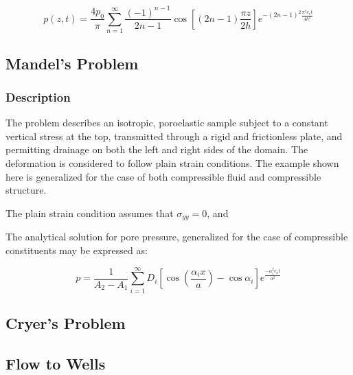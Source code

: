 \begin{equation}
 p(z,t) = \frac{4 p_{0}} {\pi} \sum_{n = 1}^{\infty} \frac{(-1)^{n-1}}{2n-1} \cos \left[ \left(2 n -1 \right) \frac{\pi z}{2 h} \right] e^{-\left(2 n - 1 \right)^{2} \frac{ \pi^{2} c_{v} t}{4 h^{2}}}
\end{equation}

\subsection{Mandel's Problem}

\subsubsection{Description}
The problem describes an isotropic, poroelastic sample subject to a constant vertical stress at the top, transmitted through a rigid and frictionless plate, and permitting drainage on both the left and right sides of the domain. The deformation is considered to follow plain strain conditions. The example shown here is generalized for the case of both compressible fluid and compressible structure.\par

The plain strain condition assumes that $\sigma_{yy} = 0$, and 


The analytical solution for pore pressure, generalized for the case of compressible
constituents may be expressed as\cite{Cheng:Detourany:1988}:

\begin{equation}
 p = \frac{1}{A_{2} - A_{1}}   \sum_{i=1}^{\infty} D_{i} \left[ \cos \left( \frac{\alpha_{i}x}{a} \right) - \cos \alpha_{i} \right] e^{\frac{-\alpha_{i}^{2} c_{x} t}{a^{2}}} 
\end{equation}


\subsection{Cryer's Problem}

\subsection{Flow to Wells}

